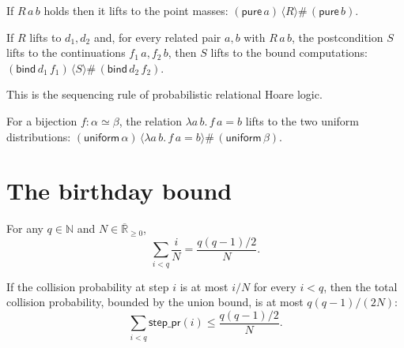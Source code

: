 \begin{lemma}
  \label{lem:liftr-pure}
  \leanok
  If $R\,a\,b$ holds then it lifts to the point masses:
  $(\mathsf{pure}\,a)\,\langle R\rangle\#\,(\mathsf{pure}\,b)$.
\end{lemma}

\begin{theorem}
  \label{thm:liftr-bind}
  \leanok
  If $R$ lifts to $d_1, d_2$ and, for every related pair $a, b$ with $R\,a\,b$,
  the postcondition $S$ lifts to the continuations $f_1\,a, f_2\,b$, then $S$
  lifts to the bound computations:
  $(\mathsf{bind}\,d_1\,f_1)\,\langle S\rangle\#\,(\mathsf{bind}\,d_2\,f_2)$.
\end{theorem}

This is the sequencing rule of probabilistic relational Hoare logic.

\begin{lemma}
  \label{lem:liftr-uniform-bij}
  \leanok
  For a bijection $f : \alpha \simeq \beta$, the relation
  $\lambda a\,b.\,f\,a = b$ lifts to the two uniform distributions:
  $(\mathsf{uniform}\,\alpha)\,\langle \lambda a\,b.\,f\,a = b\rangle\#\,
   (\mathsf{uniform}\,\beta)$.
\end{lemma}

\section{The birthday bound}

\begin{theorem}
  \label{thm:gauss-sum}
  \leanok
  For any $q \in \mathbb{N}$ and $N \in \overline{\mathbb{R}}_{\geq 0}$,
  \[
    \sum_{i < q} \frac{i}{N} = \frac{q(q-1)/2}{N}.
  \]
\end{theorem}

\begin{theorem}
  \label{thm:birthday-bound-sum}
  \leanok
  If the collision probability at step $i$ is at most $i/N$ for every $i < q$,
  then the total collision probability, bounded by the union bound, is at most
  $q(q-1)/(2N)$:
  \[
    \sum_{i < q} \mathsf{step\_pr}(i) \leq \frac{q(q-1)/2}{N}.
  \]
\end{theorem}


